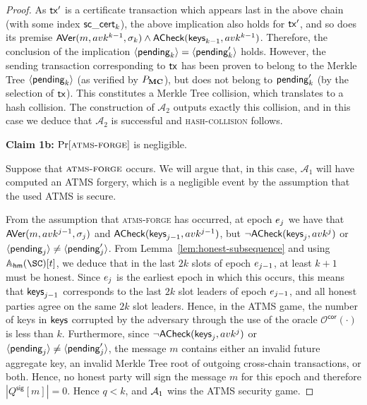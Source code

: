 \begin{proof}
  As $\mathsf{tx}'$ is a certificate transaction which appears last in the above chain
  (with some index $\mathsf{sc\_cert}_k$), the above implication also holds for $\mathsf{tx}'$,
  and so does its premise
  $
    \textsf{AVer}(m, avk^{k-1}, \sigma_k)
    \land
    \textsf{ACheck}(\textsf{keys}_{k-1}, avk^{k-1})
  $.
  Therefore, the conclusion of the implication
  $\langle\mathsf{pending}_k\rangle = \langle\mathsf{pending}'_k\rangle$ holds.
  However, the sending transaction corresponding to $\mathsf{tx}$ has been proven to belong to the Merkle Tree
  $\langle\mathsf{pending}_k\rangle$ (as verified by $P_{\mathbf{MC}}$), but does not belong
  to $\mathsf{pending}'_k$ (by the selection of $\mathsf{tx}$). This constitutes a Merkle Tree collision,
  which translates to a hash collision. The construction of $\mathcal{A}_2$
  outputs exactly this collision, and in this case we deduce that
  $\mathcal{A}_2$ is successful and \textsc{hash-collision} follows.

  \textbf{Claim 1b:} $\Pr[\textsc{atms-forge}]$  is negligible.

  \noindent
  Suppose that $\textsc{atms-forge}$ occurs. We will argue that, in this case,
  $\mathcal{A}_1$ will have computed an ATMS forgery, which is a negligible
  event by the assumption that the used ATMS is secure.

  From the assumption that
  \textsc{atms-forge} has occurred, at epoch $e_j$ we have that
  $\textsf{AVer}(m, avk^{j-1}, \sigma_j)$ and $\textsf{ACheck}(\textsf{keys}_{j-1},
  avk^{j-1})$, but $\lnot \textsf{ACheck}(\textsf{keys}_j, avk^j)$ or
  $\langle\mathsf{pending}_j\rangle \neq \langle\mathsf{pending}'_j\rangle$. From
  Lemma~\ref{lem:honest-subsequence} and using $\Assum_{\hm}(\SC)[t]$, we deduce that in the last $2k$ slots of epoch
  $e_{j-1}$, at least $k+1$ must be honest. Since $e_j$ is the
  earliest epoch in which this occurs, this means that $\textsf{keys}_{j-1}$
  corresponds to the last $2k$ slot leaders of epoch $e_{j-1}$, and all
  honest parties agree on the same $2k$ slot leaders. Hence, in the ATMS game,
  the number of keys in $\textsf{keys}$ corrupted by the adversary through the use
  of the oracle $\mathcal{O}^\textsf{cor}(\cdot)$ is less than $k$. Furthermore,
  since $\lnot \textsf{ACheck}(\textsf{keys}_j, avk^j)$ or $\langle\mathsf{pending}_j\rangle \neq \langle\mathsf{pending}'_j\rangle$,
  the message $m$ contains either an invalid future aggregate key,
  an invalid Merkle Tree root of outgoing cross-chain transactions, or both.
  Hence, no honest party will sign the message $m$ for this epoch and therefore $|Q^\textsf{sig}[m]| = 0$. Hence
  $q < k$, %
  and $\mathcal{A}_1$ wins the ATMS security game.


\end{proof}
